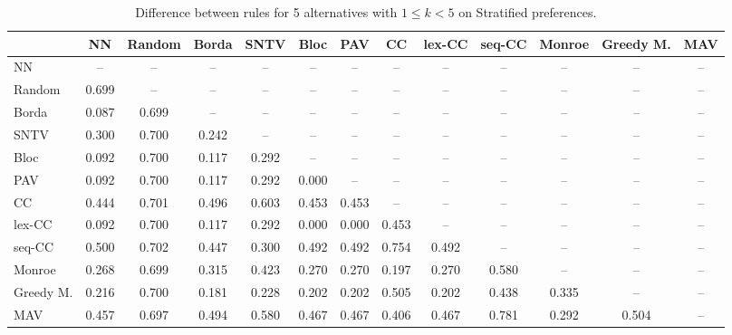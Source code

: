 
\begin{table*}[h!]
\centering
\begin{tabular}{lcccccccccccc}
\toprule
 & NN & Random & Borda & SNTV & Bloc & PAV & CC & lex-CC & seq-CC & Monroe & Greedy M. & MAV \\
\midrule
NN & -- & -- & -- & -- & -- & -- & -- & -- & -- & -- & -- & -- \\
Random & 0.699 & -- & -- & -- & -- & -- & -- & -- & -- & -- & -- & -- \\
Borda & 0.087 & 0.699 & -- & -- & -- & -- & -- & -- & -- & -- & -- & -- \\
SNTV & 0.300 & 0.700 & 0.242 & -- & -- & -- & -- & -- & -- & -- & -- & -- \\
Bloc & 0.092 & 0.700 & 0.117 & 0.292 & -- & -- & -- & -- & -- & -- & -- & -- \\
PAV & 0.092 & 0.700 & 0.117 & 0.292 & 0.000 & -- & -- & -- & -- & -- & -- & -- \\
CC & 0.444 & 0.701 & 0.496 & 0.603 & 0.453 & 0.453 & -- & -- & -- & -- & -- & -- \\
lex-CC & 0.092 & 0.700 & 0.117 & 0.292 & 0.000 & 0.000 & 0.453 & -- & -- & -- & -- & -- \\
seq-CC & 0.500 & 0.702 & 0.447 & 0.300 & 0.492 & 0.492 & 0.754 & 0.492 & -- & -- & -- & -- \\
Monroe & 0.268 & 0.699 & 0.315 & 0.423 & 0.270 & 0.270 & 0.197 & 0.270 & 0.580 & -- & -- & -- \\
Greedy M. & 0.216 & 0.700 & 0.181 & 0.228 & 0.202 & 0.202 & 0.505 & 0.202 & 0.438 & 0.335 & -- & -- \\
MAV & 0.457 & 0.697 & 0.494 & 0.580 & 0.467 & 0.467 & 0.406 & 0.467 & 0.781 & 0.292 & 0.504 & -- \\
\bottomrule
\end{tabular}

\caption{Difference between rules for 5 alternatives with $1 \leq k < 5$ on Stratified preferences.}
\end{table*}
